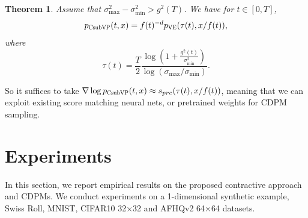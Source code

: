 \documentclass[letterpaper,10pt,reqno]{amsart}
\newtheorem{theorem}{Theorem}
\numberwithin{equation}{section}
\begin{document}
\begin{theorem}
Assume that $\sigma^2_{\max}-\sigma^2_{\min}>g^2(T)$.
We have for $t\in [0,T]$, 
\begin{equation}
p_{\scalebox{0.7}{CsubVP}}(t,x) = f(t)^{-d} p_{\scalebox{0.7}{VE}}(\tau(t),x/f(t)),
\end{equation}
where
\begin{equation}
\tau(t)=\frac{T}{2}\frac{\log(1+\frac{g^2(t)}{\sigma^2_{\min}})}{\log(\sigma_{\max}/\sigma_{\min})}.
\end{equation}
\end{theorem}
\quad So it suffices to take $\nabla \log p_{\scalebox{0.7}{CsubVP}}(t,x)\approx s_{pre}(\tau(t),x/f(t))$,
meaning that we can exploit existing score matching neural nets, 
or pretrained weights for CDPM sampling.

\section{Experiments}
\label{sc4}
\quad In this section, we report empirical results on the proposed contractive approach
and CDPMs.
We conduct experiments on a 1-dimensional synthetic example, Swiss Roll, MNIST, CIFAR10 32$\times$32 and AFHQv2 64$\times$64 datasets.
\end{document}
